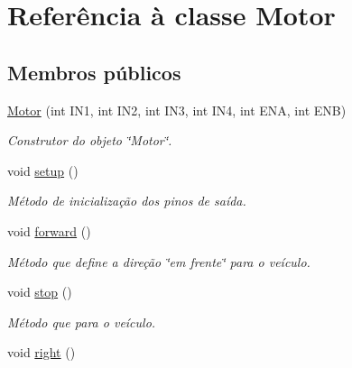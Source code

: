 \hypertarget{class_motor}{}\section{Referência à classe Motor}
\label{class_motor}
\subsection*{Membros públicos}
\begin{DoxyCompactItemize}
\item 
\mbox{\hyperlink{class_motor_adffd8a4eee235c6f4ac2e226febdb2ed}{Motor}} (int I\+N1, int I\+N2, int I\+N3, int I\+N4, int E\+NA, int E\+NB)
\begin{DoxyCompactList}\small\item\em Construtor do objeto \char`\"{}\+Motor\char`\"{}. \end{DoxyCompactList}\item 
\mbox{\label{class_motor_a1a448ab157a538a9d8fd07a27776fee3}} 
void \mbox{\hyperlink{class_motor_a1a448ab157a538a9d8fd07a27776fee3}{setup}} ()
\begin{DoxyCompactList}\small\item\em Método de inicialização dos pinos de saída. \end{DoxyCompactList}\item 
\mbox{\label{class_motor_ae804085b9a09f64031558711bfd700ac}} 
void \mbox{\hyperlink{class_motor_ae804085b9a09f64031558711bfd700ac}{forward}} ()
\begin{DoxyCompactList}\small\item\em Método que define a direção \char`\"{}em frente\char`\"{} para o veículo. \end{DoxyCompactList}\item 
\mbox{\label{class_motor_a015fd5308d4d27e5dcf7f9ea3d5c03f6}} 
void \mbox{\hyperlink{class_motor_a015fd5308d4d27e5dcf7f9ea3d5c03f6}{stop}} ()
\begin{DoxyCompactList}\small\item\em Método que para o veículo. \end{DoxyCompactList}\item 
\mbox{\label{class_motor_a975a6b228a43d419235b7ef51e41856d}} 
void \mbox{\hyperlink{class_motor_a975a6b228a43d419235b7ef51e41856d}{right}} ()

\end{DoxyCompactItemize}
